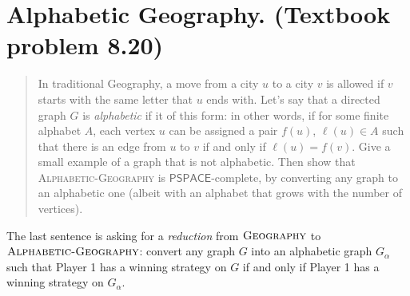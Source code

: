 

\maketitle
\thispagestyle{firststyle}
\vspace{-2.0cm}

\section{Alphabetic Geography. (Textbook problem 8.20)}
\begin{quote}
    In traditional Geography, a move from a city $u$ to a city $v$ is allowed if $v$ starts with the same letter that $u$ ends with.
    Let’s say that a directed graph $G$ is \emph{alphabetic} if it of this form:
    in other words, if for some finite alphabet $A$,
    each vertex $u$ can be assigned a pair $f(u)$, $\ell(u) \in A$
    such that there is an edge from $u$ to $v$
    if and only if $\ell(u) = f(v)$.
    Give a small example of a graph that is not alphabetic.
    Then show that \textsc{Alphabetic-Geography} is $\mathsf{PSPACE}$-complete,
    by converting any graph to an alphabetic one
    (albeit with an alphabet that grows with the number of vertices).
\end{quote}
The last sentence is asking for a \emph{reduction} from $\textsc{Geography}$ to $\textsc{Alphabetic-Geography}$:
convert any graph $G$ into an alphabetic graph $G_\alpha$ such that
Player 1 has a winning strategy on $G$
if and only if
Player 1 has a winning strategy on $G_\alpha$.

